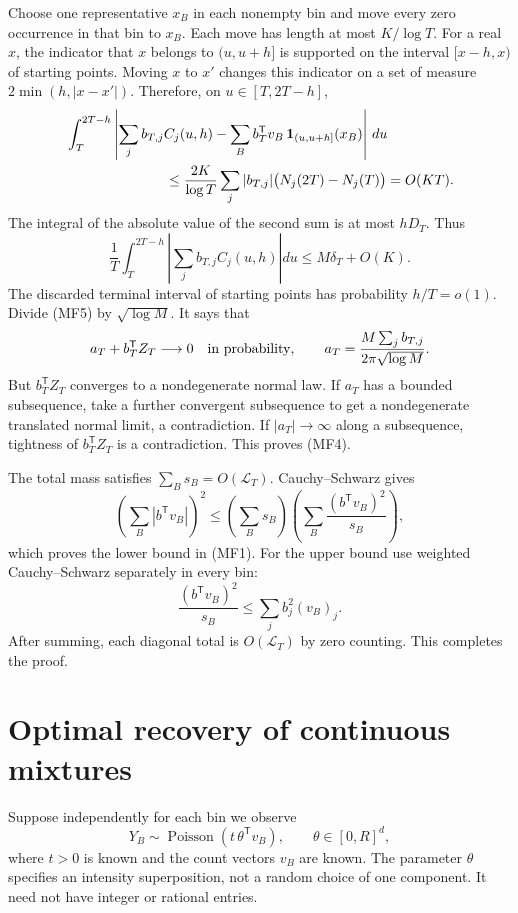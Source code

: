 Choose one representative $x_B$ in each nonempty bin and move every zero
occurrence in that bin to $x_B$.  Each move has length at most
$K/\log T$.  For a real $x$, the indicator that $x$ belongs to $(u,u+h]$
is supported on the interval $[x-h,x)$ of starting points.  Moving $x$
to $x'$ changes this indicator on a set of measure
$2\min(h,|x-x'|)$.  Therefore, on $u\in[T,2T-h]$,
\begin{align*}
 &\int_T^{2T-h}\left|\sum_j b_{T,j}C_j(u,h)
      -\sum_B b_T^{\mathsf T}v_B\,
                    \boldsymbol 1_{(u,u+h]}(x_B)\right|\,du
 \\
 &\hspace{25mm}\le
 \frac{2K}{\log T}\sum_j|b_{T,j}|\bigl(N_j(2T)-N_j(T)\bigr)
 =O(KT).
\end{align*}
The integral of the absolute value of the second sum is at most $hD_T$.
Thus
\[
 \frac1T\int_T^{2T-h}\left|\sum_j b_{T,j}C_j(u,h)\right|du
 \le M\delta_T+O(K).
\tag{MF5}
\]
The discarded terminal interval of starting points has probability
$h/T=o(1)$.  Divide (MF5) by $\sqrt{\log M}$.  It says that
\[
 a_T+b_T^{\mathsf T}Z_T\longrightarrow0
 \quad\hbox{in probability},\qquad
 a_T=\frac{M\sum_jb_{T,j}}{2\pi\sqrt{\log M}}.
\]
But $b_T^{\mathsf T}Z_T$ converges to a nondegenerate normal law.  If $a_T$
has a bounded subsequence, take a further convergent subsequence to get a
nondegenerate translated normal limit, a contradiction.  If $|a_T|\to\infty$
along a subsequence, tightness of $b_T^{\mathsf T}Z_T$ is a contradiction.
This proves (MF4).

The total mass satisfies $\sum_Bs_B=O(\mathcal L_T)$.  Cauchy--Schwarz gives
\[
 \left(\sum_B|b^{\mathsf T}v_B|\right)^2
 \le\left(\sum_Bs_B\right)
      \left(\sum_B\frac{(b^{\mathsf T}v_B)^2}{s_B}\right),
\]
which proves the lower bound in (MF1).  For the upper bound use weighted
Cauchy--Schwarz separately in every bin:
\[
 \frac{(b^{\mathsf T}v_B)^2}{s_B}
 \le\sum_j b_j^2(v_B)_j.
\]
After summing, each diagonal total is $O(\mathcal L_T)$ by zero counting.
This completes the proof.

\section{Optimal recovery of continuous mixtures}

Suppose independently for each bin we observe
\[
 Y_B\sim\operatorname{Poisson}(t\,\theta^{\mathsf T}v_B),
 \qquad \theta\in[0,R]^d,
\tag{MF6}
\]
where $t>0$ is known and the count vectors $v_B$ are known.  The parameter
$\theta$ specifies an intensity superposition, not a random choice of one
component.  It need not have integer or rational entries.

